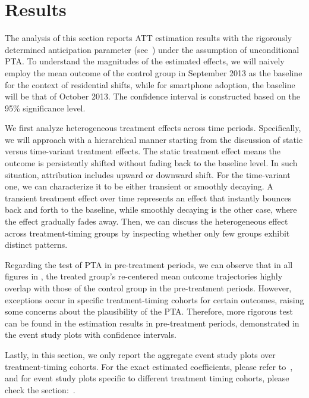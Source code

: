 
\chapter{Results}\label{results}
The analysis of this section reports ATT estimation results with the rigorously determined anticipation parameter (see~) under the assumption of unconditional PTA.
To understand the magnitudes of the estimated effects, we will naively employ the mean outcome of the control group in September 2013 as the baseline for the context of residential shifts, while for smartphone adoption, the baseline will be that of October 2013.
The confidence interval is constructed based on the 95\% significance level.

We first analyze heterogeneous treatment effects across time periods.
Specifically, we will approach with a hierarchical manner starting from the discussion of static versus time-variant treatment effects.
The static treatment effect means the outcome is persistently shifted without fading back to the baseline level.
In such situation, attribution includes upward or downward shift.
For the time-variant one, we can characterize it to be either transient or smoothly decaying.
A transient treatment effect over time represents an effect that instantly bounces back and forth to the baseline, while smoothly decaying is the other case, where the effect gradually fades away.
Then, we can discuss the heterogeneous effect across treatment-timing groups by inspecting whether only few groups exhibit distinct patterns.

Regarding the test of PTA in pre-treatment periods, we can observe that in all figures in , the treated group's re-centered mean outcome trajectories highly overlap with those of the control group in the pre-treatment periods.
However, exceptions occur in specific treatment-timing cohorts for certain outcomes, raising some concerns about the plausibility of the PTA. Therefore, more rigorous test can be found in the estimation results in pre-treatment periods, demonstrated in the event study plots with confidence intervals.

Lastly, in this section, we only report the aggregate event study plots over treatment-timing cohorts. For the exact estimated coefficients, please refer to~, and for event study plots specific to different treatment timing cohorts, please check the section:~.


